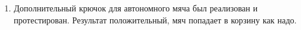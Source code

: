 \begin{enumerate}
\begin{enumerate}
		\item Дополнительный крючок для автономного мяча был реализован и протестирован. Результат положительный, мяч попадает в корзину как надо.
		\begin{figure}[H]
			\begin{minipage}[h]{0.31\linewidth}
			\end{minipage}
			\hfill
			\begin{minipage}[h]{0.31\linewidth}

\end{minipage}
\end{figure}
\end{enumerate}
\end{enumerate}
